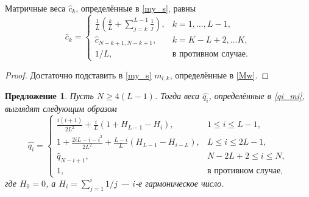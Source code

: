 \documentclass[12pt,a4paper,fleqn,leqno]{article}
\newtheorem{proposition}{Предложение}%
\begin{document}
\begin{lemma} \label{myweightstat}
Матричные веса $\hat c_k$, определённые в \eqref{my_s}, равны
\begin{equation*}
\hat c_k = \begin{cases}
\frac{1}{L}\left(\frac{k}{L} + \sum_{j=k}^{L-1} \frac{1}{j} \right),& k = 1, \ldots, L-1, \\
\hat c_{N - k + 1, N - k + 1}, & k = K - L + 2, \ldots K, \\
1/L, &\text{в противном случае}.
\end{cases}
\end{equation*}
\end{lemma}

\begin{proof}
Достаточно подставить в \eqref{my_s} $m_{l,k}$, определённые в \eqref{Mw}.
\end{proof}

\begin{proposition} \label{myserweightstat}
Пусть $N \ge 4(L-1)$. Тогда веса $\hat{q_i}$, определённые в \eqref{qi_mi},
выглядят следующим образом
\begin{equation*}
\hat{q_i} = \begin{cases}
\frac{i(i+1)}{2 L^2} + \frac{i}{L}(1 + H_{L-1} - H_i), &1 \le i \le L-1, \\
1 + \frac{2iL-i-i^2}{2L^2} + \frac{L-i}{L}(H_{L-1} - H_{i - L}), & L \le i \le 2L-1, \\
\hat{q}_{N-i+1}, &N-2L+2 \le i \le N, \\
1, &\text{в противном случае},
\end{cases}
\end{equation*}
где $H_0 = 0$, а $H_i = \sum_{j=1}^i 1/j$ --- $i$-е гармоническое число.
\end{proposition}
\end{document}
